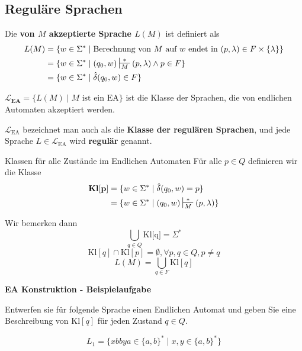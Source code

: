 \documentclass[a4paper, 11pt]{article}
\newcommand\myTitle[1]{{\large \textbf {#1}}}
\begin{document}
	\subsection{Reguläre Sprachen}

	Die \textbf{von $M$ akzeptierte Sprache $L(M)$} ist definiert als
	\begin{align*}
		L(M) &= \{w \in \Sigma^* \mid \text{Berechnung von }M \text{ auf } w \text{ endet in } (p, \lambda) \in F \times \{\lambda \}\}\\
		&= \{w \in \Sigma^* \mid (q_0, w)\sststile{M}{*}(p, \lambda) \land p \in F\}\\
		&= \{w \in \Sigma^* \mid \hat{\delta}(q_0, w) \in F\}
	\end{align*}
	\begin{mainbox}{}
		$\mathbf{\mathcal{L}_{\textbf{EA}}} = \{L(M) \mid M \text{ ist ein EA}\}$ ist die Klasse der Sprachen, die von endlichen Automaten akzeptiert werden.

		$\mathcal{L}_{\text{EA}}$ bezeichnet man auch als die \textbf{Klasse der regulären Sprachen}, und jede Sprache $L \in \mathcal{L}_{\text{EA}}$ wird \textbf{regulär} genannt.
	\end{mainbox}

	\begin{mainbox}{Klassen für alle Zustände im Endlichen Automaten}
		Für alle $p \in Q$ definieren wir die Klasse
		\begin{align*}
			\textbf{Kl}\mathbf{[p]} &= \{w \in \Sigma^* \mid \hat{\delta}(q_0, w) = p\}\\
			&= \{w \in \Sigma^* \mid (q_0, w) \sststile{M}{*}(p, \lambda)\}
		\end{align*}
	\end{mainbox}
	Wir bemerken dann
	$$\bigcup_{q \in Q}\text{Kl[q]} = \Sigma^*$$
    $$\text{Kl}[q] \cap \text{Kl}[p] = \emptyset, \forall p, q \in Q, p \neq q$$
    $$L(M) = \bigcup_{q \in F}\text{Kl}[q]$$





	\myTitle{EA Konstruktion - Beispielaufgabe}

	Entwerfen sie für folgende Sprache einen Endlichen Automat und geben Sie eine Beschreibung von Kl$[q]$ für jeden Zustand $q \in Q$.

	$$L_1 = \{xbbya \in \{a, b\}^* \mid x,y \in \{a, b\}^*\}$$
\end{document}
